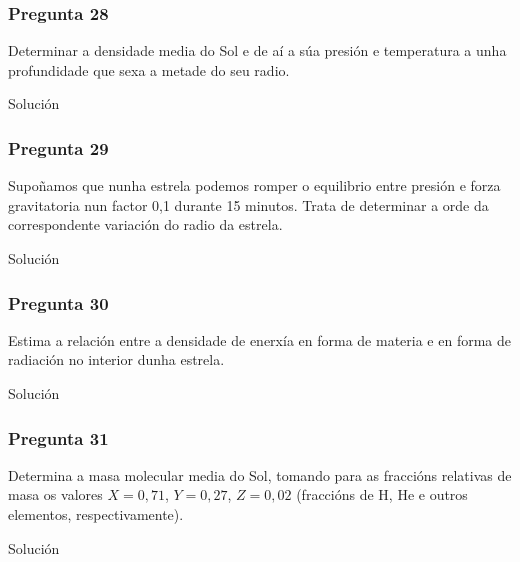 \vspace*{2em}

\begin{Enunciado}
	\subsubsection{Pregunta 28}

	Determinar a densidade media do Sol e de aí a súa presión e temperatura a unha profundidade que sexa a metade do seu radio.

\end{Enunciado}
Solución

\vspace*{2em}

\begin{Enunciado}
	\subsubsection{Pregunta 29}

	Supoñamos que nunha estrela podemos romper o equilibrio entre presión e forza gravitatoria nun factor 0{,}1 durante 15 minutos. Trata de determinar a orde da correspondente variación do radio da estrela.

\end{Enunciado}
Solución

\vspace*{2em}

\begin{Enunciado}
	\subsubsection{Pregunta 30}

	Estima a relación entre a densidade de enerxía en forma de materia e en forma de radiación no interior dunha estrela.

\end{Enunciado}
Solución

\vspace*{2em}
\begin{Enunciado}
	\subsubsection{Pregunta 31}

	Determina a masa molecular media do Sol, tomando para as fraccións relativas de masa os valores $X = 0{,}71$, $Y = 0{,}27$, $Z = 0{,}02$ (fraccións de H, He e outros elementos, respectivamente).

\end{Enunciado}
Solución

